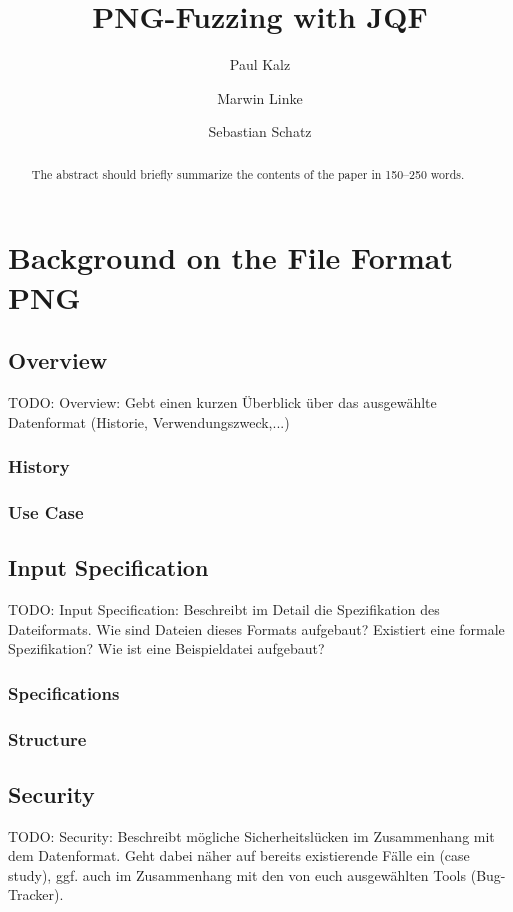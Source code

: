 \documentclass[runningheads]{llncs}
\begin{document}
%
\title{PNG-Fuzzing with JQF}
%
%
\author{Paul Kalz \and Marwin Linke \and Sebastian Schatz}
%
\maketitle              %
%
\begin{abstract}
The abstract should briefly summarize the contents of the paper in
150--250 words.

\end{abstract}
%
%
%
\section{Background on the File Format PNG}
\subsection{Overview}
TODO: Overview: Gebt einen kurzen Überblick über das ausgewählte Datenformat (Historie, Verwendungszweck,...)
\subsubsection{History}
\subsubsection{Use Case}
\subsection{Input Specification}
TODO: Input Specification: Beschreibt im Detail die Spezifikation des Dateiformats. Wie sind Dateien dieses Formats aufgebaut? Existiert eine formale Spezifikation? Wie ist eine Beispieldatei aufgebaut?
\subsubsection{Specifications}
\subsubsection{Structure}
\subsection{Security}
TODO: Security: Beschreibt mögliche Sicherheitslücken im Zusammenhang mit dem Datenformat. Geht dabei näher auf bereits existierende Fälle ein (case study), ggf. auch im Zusammenhang mit den von euch ausgewählten Tools (Bug-Tracker).
\end{document}
